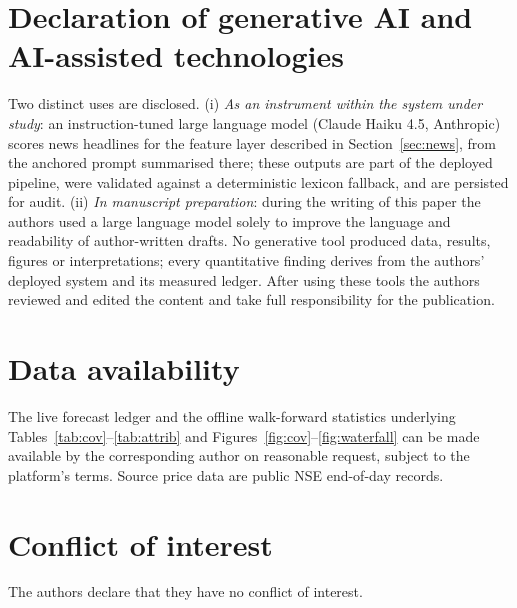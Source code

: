 \documentclass[10pt, a4paper, oneside]{article}
\theoremstyle{definition}
\theoremstyle{plain}
\begin{document}
\section*{Declaration of generative AI and AI-assisted technologies}
Two distinct uses are disclosed. (i) \emph{As an instrument within the system under
study}: an instruction-tuned large language model (Claude Haiku 4.5, Anthropic) scores
news headlines for the feature layer described in Section~\ref{sec:news}, from the
anchored prompt summarised there; these outputs are part of the deployed pipeline,
were validated against a deterministic lexicon fallback, and are persisted for audit.
(ii) \emph{In manuscript preparation}: during the writing of this paper the authors
used a large language model solely to improve the language and readability of
author-written drafts. No generative tool produced data, results, figures or
interpretations; every quantitative finding derives from the authors' deployed system
and its measured ledger. After using these tools the authors reviewed and edited the
content and take full responsibility for the publication.

\section*{Data availability}
The live forecast ledger and the offline walk-forward statistics underlying
Tables~\ref{tab:cov}--\ref{tab:attrib} and Figures~\ref{fig:cov}--\ref{fig:waterfall}
can be made available by the corresponding author on reasonable request, subject to the
platform's terms. Source price data are public NSE end-of-day records.

\section*{Conflict of interest}
The authors declare that they have no conflict of interest.
\end{document}
